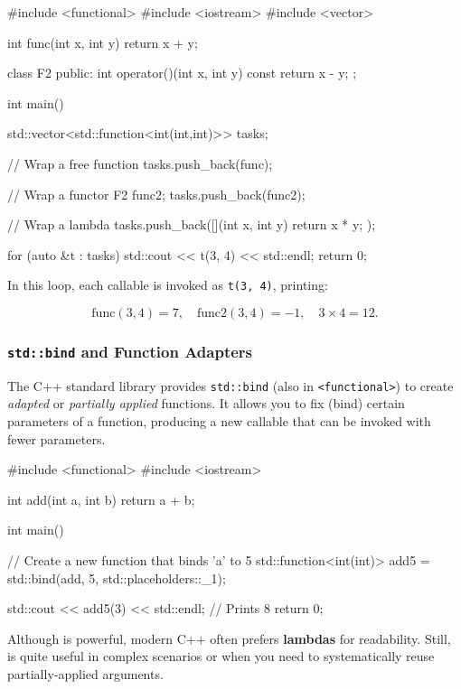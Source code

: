 \begin{codeblock}[language=C++]
#include <functional>
#include <iostream>
#include <vector>

int func(int x, int y) { return x + y; }

class F2 {
public:
    int operator()(int x, int y) const {
        return x - y;
    }
};

int main() {
    std::vector<std::function<int(int,int)>> tasks;

    // Wrap a free function
    tasks.push_back(func);

    // Wrap a functor
    F2 func2;
    tasks.push_back(func2);

    // Wrap a lambda
    tasks.push_back([](int x, int y){ return x * y; });

    for (auto &t : tasks) {
        std::cout << t(3, 4) << std::endl;
    }
    return 0;
}
\end{codeblock}

In this loop, each callable is invoked as \texttt{t(3, 4)}, printing:


$$
   \text{func}(3,4) = 7, \quad \text{func2}(3,4) = -1, \quad 3 \times 4 = 12.
$$

\subsubsection{\texttt{std::bind} and Function Adapters}
The C++ standard library provides \texttt{std::bind} (also in \texttt{<functional>}) to create \textit{adapted} or \textit{partially applied} functions. It allows you to fix (bind) certain parameters of a function, producing a new callable that can be invoked with fewer parameters.

\begin{codeblock}[language=C++]
#include <functional>
#include <iostream>

int add(int a, int b) {
    return a + b;
}

int main() {
    // Create a new function that binds 'a' to 5
    std::function<int(int)> add5 =
        std::bind(add, 5, std::placeholders::_1);

    std::cout << add5(3) << std::endl; // Prints 8
    return 0;
}
\end{codeblock}

\begin{observationblock}
Although  is powerful, modern C++ often prefers \textbf{lambdas} for readability. Still,  is quite useful in complex scenarios or when you need to systematically reuse partially-applied arguments.
\end{observationblock}


